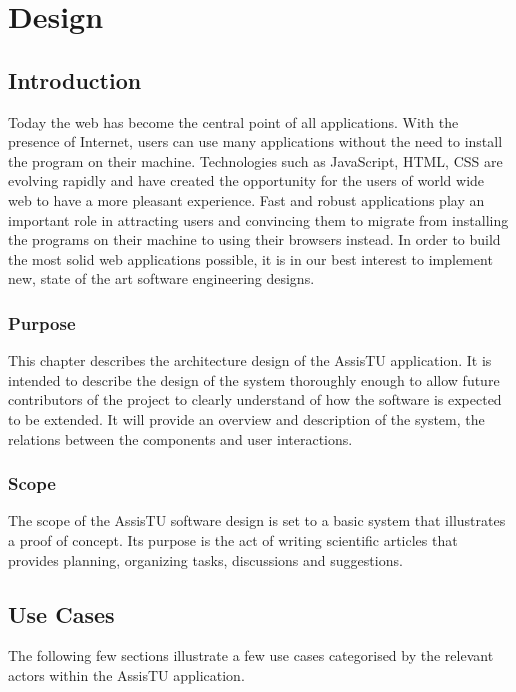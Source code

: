 \chapter{Design}

\section{Introduction} %
\label{sec:introduction}

Today the web has become the central point of all applications. With the presence of Internet, users can use many applications without the need to 
install the program on their machine. Technologies such as JavaScript, HTML, CSS are evolving rapidly and have created the opportunity for the users of 
world wide web to have a more pleasant experience. Fast and robust applications play an important role in attracting users and convincing them to 
migrate from installing the programs on their machine to using their browsers instead. In order to build the most solid web applications possible, 
it is in our best interest to implement new, state of the art software engineering designs.

\subsection{Purpose} %
\label{sub:purpose}

This chapter describes the architecture design of the AssisTU application. It is intended to describe the design of the system 
thoroughly enough to allow future contributors of the project to clearly understand of how the software is expected to be extended. It will provide 
an overview and description of the system, the relations between the components and user interactions. 

\subsection{Scope} %
\label{sub:scope}
The scope of the AssisTU software design is set to a basic system that illustrates a proof of concept. Its purpose is the act of writing 
scientific articles that provides planning, organizing tasks, discussions and suggestions.

\section{Use Cases} %
\label{sec:system_overview}
The following few sections illustrate a few use cases categorised by the relevant actors within the AssisTU application.
